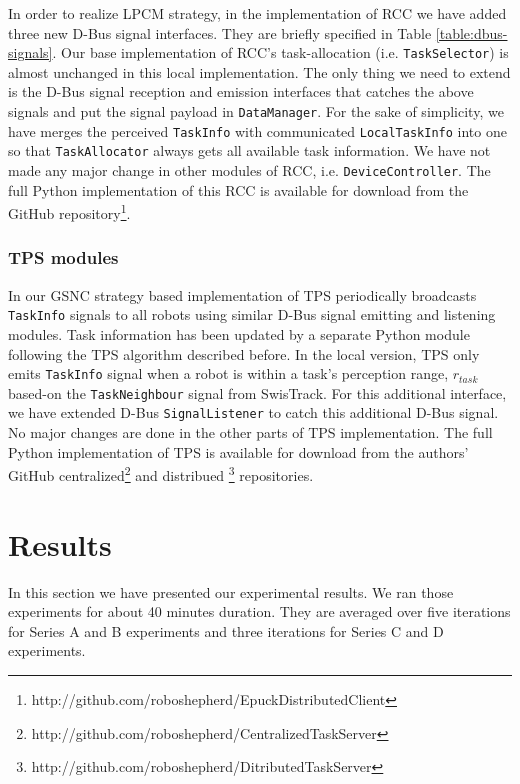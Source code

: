 \documentclass[journal]{IEEEtran}
\begin{document}
In order to realize LPCM strategy, in the implementation of RCC we have added three new D-Bus signal interfaces. They are briefly specified in Table \ref{table:dbus-signals}. Our base implementation of RCC's task-allocation (i.e. \texttt{TaskSelector}) is almost unchanged in this local implementation. The only thing we need to extend is the D-Bus signal reception and emission interfaces that catches the above signals and put the signal payload in \texttt{DataManager}. For the sake of simplicity, we have merges the perceived \texttt{TaskInfo} with communicated \texttt{LocalTaskInfo} into one so that \texttt{TaskAllocator} always gets all available task information. We have not made any major change in other modules of RCC, i.e. \texttt{DeviceController}. The full Python implementation of this RCC is available for download from the GitHub repository\footnote{http://github.com/roboshepherd/EpuckDistributedClient }.
\subsubsection{TPS modules}
In our GSNC strategy based implementation of TPS periodically broadcasts \texttt{TaskInfo} signals to all robots using similar D-Bus signal emitting and listening modules. Task information has been updated by a separate Python module following the TPS algorithm described before. In the local version, TPS only emits \texttt{TaskInfo} signal when a robot is within a task's perception range, $r_{task}$ based-on the \texttt{TaskNeighbour} signal from SwisTrack. For this additional interface, we have extended D-Bus \texttt{SignalListener} to catch this additional D-Bus signal.  No major changes are done in the other parts of TPS implementation. The full Python implementation of TPS is available for download from the authors' GitHub centralized\footnote{http://github.com/roboshepherd/CentralizedTaskServer}
and distribued \footnote{http://github.com/roboshepherd/DitributedTaskServer} repositories.

\section{Results}
\label{sec:results}
In this section we have presented our experimental results. We ran those experiments for about 40 minutes duration.  They are averaged over five iterations for Series A and B experiments and three iterations for Series C and D experiments. 
\end{document}
